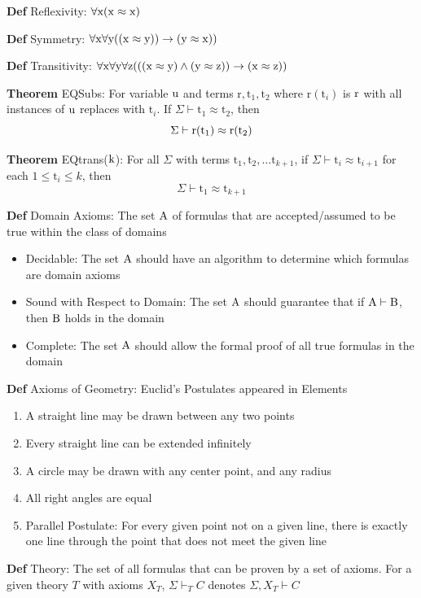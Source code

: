 \documentclass[11pt,notitlepage]{report}
\newcommand{\mr}[1]{\ensuremath{\mathrm{#1}}}
\newcommand{\tbf}[1]{\textbf{#1}}
\begin{document}
\tbf{Def} Reflexivity: $\rm \forall x(x \approx x)$

\tbf{Def} Symmetry: $\rm \forall x \forall y((x \approx y))\to(y \approx x))$

\tbf{Def} Transitivity: $\rm \forall x \forall y \forall z(((x \approx y) \wedge (y \approx z)) \to (x \approx z))$

\tbf{Theorem} EQSubs: For variable $\rm u$ and terms $\mr{r}, \mr{t}_1, \mr{t}_2$ where $\mr{r}(\mr{t}_i)$ is $\rm r$ with all instances of $\rm u$ replaces with $\mr{t}_i$. If $\Sigma \vdash \mr{t}_1 \approx \mr{t}_2$, then 
$$\Sigma \vdash \rm \mr{r}(\mr{t}_1) \approx \mr{r}(\mr{t}_2)$$

\tbf{Theorem} EQtrans($\rm k$): For all $\Sigma$ with terms $\mr{t_1, t_2,} \dots \mr{t}_{k+1}$, if $\Sigma \vdash \mr t_{i} \approx \mr{t}_{i+1}$ for each $1 \leq \mr{t}_i \leq k$, then
$$\Sigma \vdash \mr{t}_1 \approx \mr{t}_{k+1}$$

\tbf{Def} Domain Axioms: The set $\rm A$ of formulas that are accepted/assumed to be true within the class of domains
\begin{itemize}
    \item Decidable: The set $\rm A$ should have an algorithm to determine which formulas are domain axioms
    \item Sound with Respect to Domain: The set $\rm A$ should guarantee that if $\rm A \vdash B$, then $\rm B$ holds in the domain
    \item Complete: The set $\rm A$ should allow the formal proof of all true formulas in the domain
\end{itemize}

\tbf{Def} Axioms of Geometry: Euclid's Postulates appeared in Elements
\begin{enumerate}
    \item A straight line may be drawn between any two points
    \item Every straight line can be extended infinitely
    \item A circle may be drawn with any center point, and any radius
    \item All right angles are equal
    \item Parallel Postulate: For every given point not on a given line, there is exactly one line through the point that does not meet the given line
\end{enumerate}

\tbf{Def} Theory: The set of all formulas that can be proven by a set of axioms. For a given theory $T$ with axioms $X_T$, $\Sigma \vdash_T C$ denotes $\Sigma, X_T \vdash C$
\end{document}
